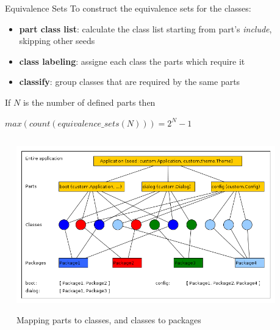 \documentclass[final]{beamer}
\newlength{\sepwid}
\newlength{\onecolwid}
\newlength{\twocolwid}
\begin{document}
\begin{frame}[t]
\begin{columns}[t]
\begin{column}{\twocolwid}
\begin{columns}[t,totalwidth=\twocolwid]
    \begin{column}{\sepwid}\end{column}			%
    \begin{column}{\onecolwid}
      \begin{block}{Equivalence Sets}
        To construct the equivalence sets for the classes:
        \begin{itemize}\justifying
          \item \textbf{part class list}: calculate the class list starting from
            part's \textit{include}, skipping other seeds
          \item \textbf{class labeling}: assigne each class the parts which require it
          \item \textbf{classify}: group classes that are required by the same parts
        \end{itemize}
        If $N$ is the number of defined parts then\\
        \begin{center}
          $ max(count(equivalence\_sets(N))) = 2^{N} - 1 $
        \end{center}
      \end{block}
    \end{column}

    \end{columns}


    \begin{figure}   %
      \begin{center}
        \includegraphics[width=20in]{g_part_layers.png} \\
        \caption{Mapping parts to classes, and classes to packages}
        \label{fig:corrSubsys}
      \end{center}
    \end{figure}


\end{column}
\end{columns}
\end{frame}
\end{document}
